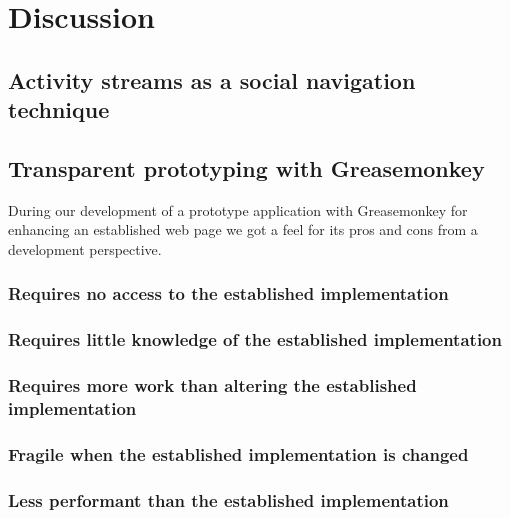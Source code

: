 \section{Discussion}

\subsection{Activity streams as a social navigation technique}

\subsection{Transparent prototyping with Greasemonkey}

During our development of a prototype application with Greasemonkey for
enhancing an established web page we got a feel for its pros and cons from a
development perspective.

\subsubsection{Requires no access to the established implementation}

\subsubsection{Requires little knowledge of the established implementation}

\subsubsection{Requires more work than altering the established
  implementation}

\subsubsection{Fragile when the established implementation is changed}

\subsubsection{Less performant than the established implementation}

